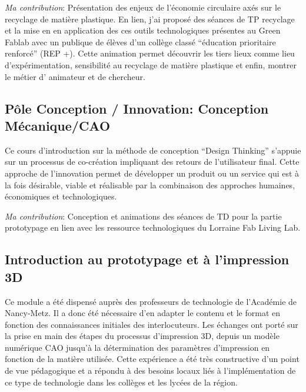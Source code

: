 \documentclass[
  11pt,
]{article}
\begin{document}
\emph{Ma contribution}: Présentation des enjeux de l'économie circulaire
axés sur le recyclage de matière plastique. En lien, j'ai proposé des
séances de TP recyclage et la mise en en application des ces outils
technologiques présentes au Green Fablab avec un publique de élèves d'un
collège classé ``éducation prioritaire renforcé'' (REP +). Cette
animation permet découvrir les tiers lieux comme lieu d'expérimentation,
sensibilité au recyclage de matière plastique et enfin, montrer le
métier d' animateur et de chercheur.

\hypertarget{puxf4le-conception-innovation-conception-muxe9caniquecao}{%
\subsection{Pôle Conception / Innovation: Conception
Mécanique/CAO}\label{puxf4le-conception-innovation-conception-muxe9caniquecao}}

Ce cours d'introduction sur la méthode de conception ``Design Thinking''
s'appuie sur un processus de co-création impliquant des retours de
l'utilisateur final. Cette approche de l'innovation permet de développer
un produit ou un service qui est à la fois désirable, viable et
réalisable par la combinaison des approches humaines, économiques et
technologiques.

\emph{Ma contribution}: Conception et animations des séances de TD pour
la partie prototypage en lien avec les ressource technologiques du
Lorraine Fab Living Lab.

\hypertarget{introduction-au-prototypage-et-uxe0-limpression-3d}{%
\subsection{Introduction au prototypage et à l'impression
3D}\label{introduction-au-prototypage-et-uxe0-limpression-3d}}

Ce module a été dispensé auprès des professeurs de technologie de
l'Académie de Nancy-Metz. Il a donc été nécessaire d'en adapter le
contenu et le format en fonction des connaissances initiales des
interlocuteurs. Les échanges ont porté sur la prise en main des étapes
du processus d'impression 3D, depuis un modèle numérique CAO jusqu'à la
détermination des paramètres d'impression en fonction de la matière
utilisée. Cette expérience a été très constructive d'un point de vue
pédagogique et a répondu à des besoins locaux liés à l'implémentation de
ce type de technologie dans les collèges et les lycées de la région.
\end{document}
